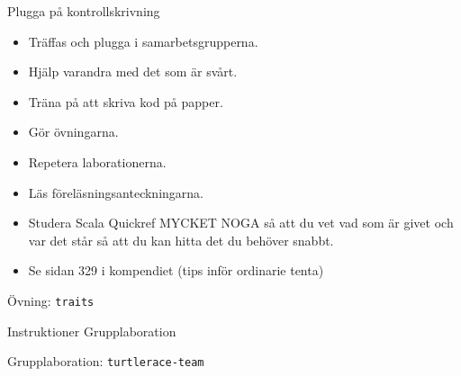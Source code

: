 \begin{Slide}{Plugga på kontrollskrivning}
\begin{itemize}
\item Träffas och plugga i samarbetsgrupperna.
\item Hjälp varandra med det som är svårt.
\item Träna på att skriva kod på papper.
\item Gör övningarna.
\item Repetera laborationerna.
\item Läs föreläsningsanteckningarna.
\item Studera Scala Quickref MYCKET NOGA så att du vet vad som är givet och var det står så att du kan hitta det du behöver snabbt.
\item Se sidan 329 i kompendiet (tips inför ordinarie tenta)
\end{itemize}
\end{Slide}









\begin{Slide}{Övning: \texttt{traits}}
\begin{itemize}\SlideFontTiny

\end{itemize}
\end{Slide}

\begin{Slide}{Instruktioner Grupplaboration}
\begin{itemize}\SlideFontSmall

\end{itemize}
\end{Slide}

\begin{Slide}{Grupplaboration: \texttt{turtlerace-team}}
\begin{itemize}

\end{itemize}
\end{Slide}



\fi

